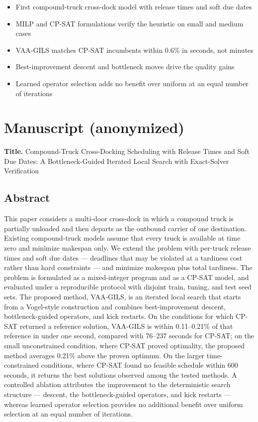 \documentclass[
]{article}
\providecommand{\tightlist}{%
  \setlength{\itemsep}{0pt}\setlength{\parskip}{0pt}}
\begin{document}
\begin{itemize}
\tightlist
\item
  First compound-truck cross-dock model with release times and soft due
  dates
\item
  MILP and CP-SAT formulations verify the heuristic on small and medium
  cases
\item
  VAA-GILS matches CP-SAT incumbents within 0.6\% in seconds, not
  minutes
\item
  Best-improvement descent and bottleneck moves drive the quality gains
\item
  Learned operator selection adds no benefit over uniform at an equal number of iterations
\end{itemize}

\newpage

\section{Manuscript (anonymized)}\label{manuscript-anonymized}

\textbf{Title.} Compound-Truck Cross-Docking Scheduling with Release
Times and Soft Due Dates: A Bottleneck-Guided Iterated Local Search with
Exact-Solver Verification

\subsection{Abstract}\label{abstract}

This paper considers a multi-door cross-dock in which a compound truck
is partially unloaded and then departs as the outbound carrier of one
destination. Existing compound-truck models assume that every truck is
available at time zero and minimize makespan only. We extend the problem
with per-truck release times and soft due dates --- deadlines that may
be violated at a tardiness cost rather than hard constraints --- and
minimize makespan plus total tardiness. The problem is formulated as a
mixed-integer program and as a CP-SAT model, and evaluated under a
reproducible protocol with disjoint train, tuning, and test seed sets.
The proposed method, VAA-GILS, is an iterated local search that starts
from a Vogel-style construction and combines best-improvement descent,
bottleneck-guided operators, and kick restarts. On the conditions for
which CP-SAT returned a reference solution, VAA-GILS is within
0.11--0.21\% of that reference in under one second, compared with
76--237 seconds for CP-SAT; on the small unconstrained condition, where
CP-SAT proved optimality, the proposed method averages 0.21\% above the
proven optimum. On the larger time-constrained conditions, where CP-SAT
found no feasible schedule within 600 seconds, it returns the best
solutions observed among the tested methods. A controlled ablation
attributes the improvement to the deterministic search structure ---
descent, the bottleneck-guided operators, and kick restarts --- whereas
learned operator selection provides no additional benefit over uniform
selection at an equal number of iterations.
\end{document}
